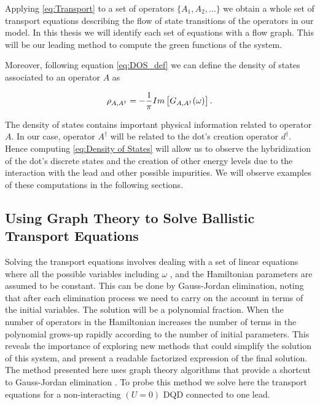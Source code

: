 \noindent Applying \ref{eq:Transport}  to a set of operators $\{A_1, A_2, \ldots \}$ we obtain a whole set of transport equations describing the flow of state transitions of the operators in our model. In this thesis we will identify each set of equations with a flow graph. This will be our leading method to compute the green functions of the system.

Moreover, following equation \ref{eq:DOS_def} we can define the density of states associated to an operator $A$ as

\begin{equation}
    \rho_{A,A^\dagger}=-\frac{1}{\pi}Im\left[G_{A,A^\dagger}(\omega)\right].
    \label{eq:Density of States}
\end{equation}

\noindent The density of states contains important physical information related to operator $A$. In our case, operator $A^\dagger$ will be related to the dot's creation operator  $d^\dagger$. Hence computing \ref{eq:Density of States} will allow us to observe the hybridization of the dot's discrete states and the creation of other energy levels due to the interaction with the lead and other possible impurities. We will observe examples of these computations in the following sections.


\subsection{Using Graph Theory to Solve Ballistic Transport Equations \label{sec:GraphMethod}}


Solving the transport equations involves dealing with a set of linear equations where all the possible variables including  $\omega$ , and the Hamiltonian parameters are assumed to be constant.  This can be done by  Gauss-Jordan elimination, noting that after each elimination process we need to carry on the account in terms of the initial  variables. The solution  will be a polynomial fraction.  When the number of operators in the Hamiltonian increases the number of terms in the polynomial grows-up rapidly according to the number of initial parameters. This reveals the importance of exploring new methods that could simplify the solution of this system, and present a readable factorized expression of the final solution.   \\

The method presented here uses graph theory algorithms that provide a shortcut to Gauss-Jordan elimination \cite{spielman10}. To probe this method we solve here the transport equations for a non-interacting $(U=0)$ DQD connected to one lead. 

